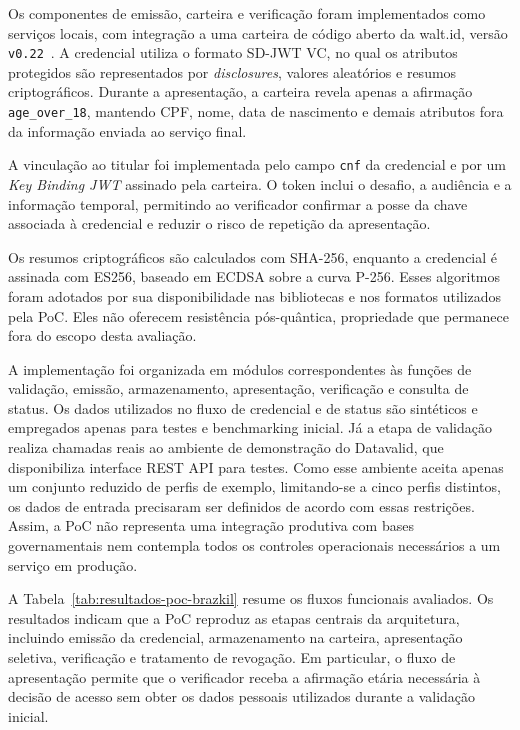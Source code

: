 \documentclass[12pt]{article}
\begin{document}
Os componentes de emissão, carteira e verificação foram implementados como serviços locais, com integração a uma carteira de código aberto da walt.id, versão \texttt{v0.22}~\cite{waltid2026}. A credencial utiliza o formato SD-JWT VC, no qual os atributos protegidos são representados por \textit{disclosures}, valores aleatórios e resumos criptográficos. Durante a apresentação, a carteira revela apenas a afirmação \texttt{age\_over\_18}, mantendo CPF, nome, data de nascimento e demais atributos fora da informação enviada ao serviço final.

A vinculação ao titular foi implementada pelo campo \texttt{cnf} da credencial e por um \textit{Key Binding JWT} assinado pela carteira. O token inclui o desafio, a audiência e a informação temporal, permitindo ao verificador confirmar a posse da chave associada à credencial e reduzir o risco de repetição da apresentação.

Os resumos criptográficos são calculados com SHA-256, enquanto a credencial é assinada com ES256, baseado em ECDSA sobre a curva P-256. Esses algoritmos foram adotados por sua disponibilidade nas bibliotecas e nos formatos utilizados pela PoC. Eles não oferecem resistência pós-quântica, propriedade que permanece fora do escopo desta avaliação.

A implementação foi organizada em módulos correspondentes às funções de validação, emissão, armazenamento, apresentação, verificação e consulta de status. Os dados utilizados no fluxo de credencial e de status são sintéticos e empregados apenas para testes e benchmarking inicial. Já a etapa de validação realiza chamadas reais ao ambiente de demonstração do Datavalid, que disponibiliza interface REST API para testes. Como esse ambiente aceita apenas um conjunto reduzido de perfis de exemplo, limitando-se a cinco perfis distintos, os dados de entrada precisaram ser definidos de acordo com essas restrições. Assim, a PoC não representa uma integração produtiva com bases governamentais nem contempla todos os controles operacionais necessários a um serviço em produção.



A Tabela~\ref{tab:resultados-poc-brazkil} resume os fluxos funcionais avaliados. Os resultados indicam que a PoC reproduz as etapas centrais da arquitetura, incluindo emissão da credencial, armazenamento na carteira, apresentação seletiva, verificação e tratamento de revogação. Em particular, o fluxo de apresentação permite que o verificador receba a afirmação etária necessária à decisão de acesso sem obter os dados pessoais utilizados durante a validação inicial.
\end{document}
